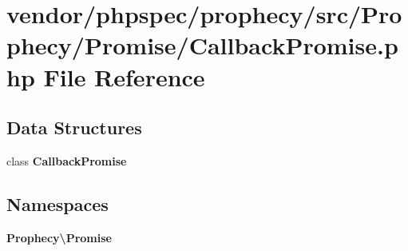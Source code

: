 \section{vendor/phpspec/prophecy/src/\+Prophecy/\+Promise/\+Callback\+Promise.php File Reference}
\label{_callback_promise_8php}
\subsection*{Data Structures}
\begin{DoxyCompactItemize}
\item 
class {\bf Callback\+Promise}
\end{DoxyCompactItemize}
\subsection*{Namespaces}
\begin{DoxyCompactItemize}
\item 
 {\bf Prophecy\textbackslash{}\+Promise}
\end{DoxyCompactItemize}
